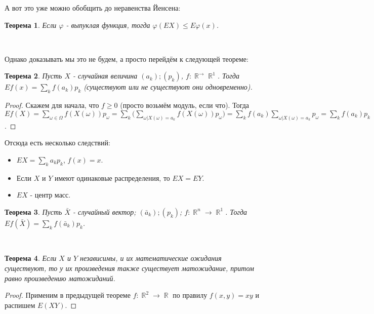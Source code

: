 \documentclass[a4paper,100pt]{article}
\theoremstyle{indented}
\newtheorem{theorem}{Теорема}
\theoremstyle{definition}
\theoremstyle{remark}
\DeclareMathOperator{\RR}{\mathbb{R}}
\begin{document}
А вот это уже можно обобщить до неравенства Йенсена: \\

\begin{theorem}
    Если $\varphi$ - выпуклая функция, тогда $\varphi(EX)\leq E\varphi(x)$. 
\end{theorem} \

Однако доказывать мы это не будем, а просто перейдём к следующей теореме: \\

\begin{theorem}
    Пусть $X$ - случайная величина $(a_k); (p_k)$, $f:\RR^\rightarrow \RR^1$. Тогда $Ef(x)=\sum_k f(a_k)p_k$ (существуют или не существуют они одновременно). 
\end{theorem}

\begin{proof}
    Скажем для начала, что $f\geq 0$ (просто возьмём модуль, если что). Тогда $E f(X)=\sum_{\omega \in \Omega} f(X(\omega))p_\omega = \sum_k \biggl( \sum_{\omega|X(\omega) = a_k} f(X(\omega)) p_\omega\biggr) = \sum_k f(a_k) \sum_{\omega | X(\omega)=a_k}p_\omega = \sum_k f(a_k)p_k$. 
\end{proof}

Отсюда есть несколько следствий:

\begin{itemize}
    \item $EX=\sum_k a_k p_k$, $f(x)=x$. 
    \item Если $X$ и $Y$ имеют одинаковые распределения, то $EX=EY$. 
    \item $EX$ - центр масс.
\end{itemize}

\begin{theorem}
    Пусть $\bar{X}$ - случайный вектор; $(\bar{a}_k); (p_k)$; $f:\RR^n \rightarrow \RR^1$. Тогда $Ef(\bar{X}) = \sum_k f(\bar{a}_k)p_k$. 
\end{theorem} \

\begin{theorem}
    Если $X$ и $Y$ независимы, и их математические ожидания существуют, то у их произведения также существует матожидание, притом равно произведению матожиданий.
\end{theorem}

\begin{proof}
    Применим в предыдущей теореме $f: \RR^2 \rightarrow \RR$ по правилу $f(x, y)=xy$ и распишем $E(XY)$. 
\end{proof}
\end{document}
